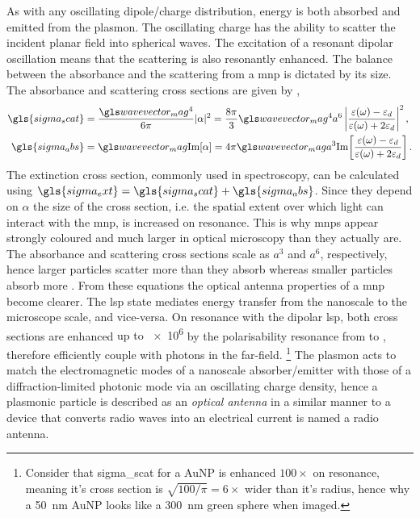 \documentclass{article}
\begin{document}
As with any oscillating {\color{red}dipole/charge distribution}, energy is both absorbed and emitted from the plasmon. The oscillating charge has the ability to scatter the incident planar field into spherical waves. The excitation of a resonant dipolar oscillation means that the scattering is also resonantly enhanced. The balance between the absorbance and the scattering from a \gls{mnp} is dictated by its size. The absorbance and scattering cross sections are given by \cite{bohren2008absorption},
\begin{subequations}
\begin{align}
\gls{sigma_scat} &= \frac{\wvm^4}{6\pi} |\alpha|^2 = \frac{8\pi}{3}\wvm^4a^6 \left| \frac{\dielectric - \epsdi}{\dielectric + 2\epsdi} \right|^2, \\
\gls{sigma_abs} &= \wvm\imag{\alpha} = 4\pi \wvm a^3 \imag{ \frac{\dielectric - \epsdi}{\dielectric + 2\epsdi} }.
\end{align}
\end{subequations}
The extinction cross section, commonly used in spectroscopy, can be calculated using $\gls{sigma_ext}=\gls{sigma_scat}+\gls{sigma_abs}$. Since they depend on $\alpha$ the size of the cross section, i.e. the spatial extent over which light can interact with the \gls{mnp}, is increased on resonance. This is why \glspl{mnp} appear strongly coloured and much larger in optical microscopy than they actually are. The absorbance and scattering cross sections scale as $a^3$ and $a^6$, respectively, hence larger particles scatter more than they absorb whereas smaller particles absorb more \cite{}. From these equations the optical antenna properties of a \gls{mnp} become clearer. The \gls{lsp} state mediates energy transfer from the nanoscale to the microscope scale, and vice-versa. On resonance with the dipolar \gls{lsp}, both cross sections are enhanced {\color{red}up to \num{e6}} by the polarisability resonance from  to , therefore efficiently couple with photons in the far-field.%
\footnote{Consider that \gls{sigma_scat} for a AuNP is enhanced $100\times$ on resonance, meaning it's cross section is $\sqrt{100/\pi}= 6\times$ wider than it's radius, hence why a \SI{50}{nm} AuNP looks like a \SI{300}{nm} green sphere when imaged.}
The plasmon acts to match the electromagnetic modes of a nanoscale absorber/emitter with those of a diffraction-limited photonic mode via an oscillating charge density, hence a plasmonic particle is described as an \textit{optical antenna} in a similar manner to a device that converts radio waves into an electrical current is named a radio antenna.
\end{document}
